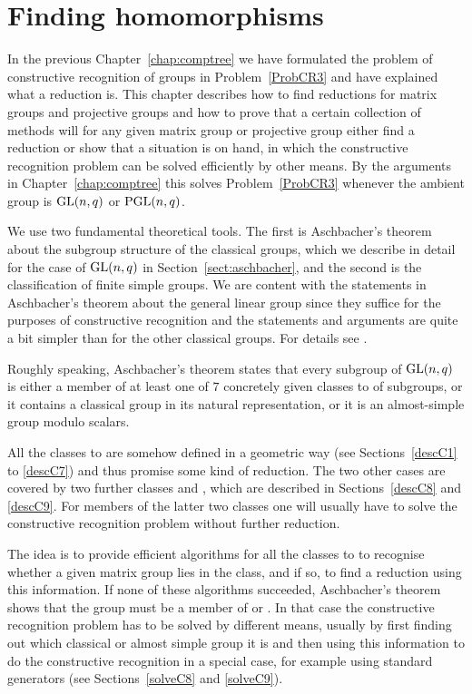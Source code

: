 
\chapter{Finding homomorphisms}
\label{chap:findhom}

In the previous Chapter~\ref{chap:comptree} we have formulated the problem
of constructive recognition of groups in Problem~\ref{ProbCR3} and have
explained what a reduction is. This chapter describes how to find
reductions for matrix groups and projective groups and how to prove
that a certain collection of methods will for any given
matrix group or projective group either find a reduction
or show that a situation is on hand, in which the constructive 
recognition problem can be solved efficiently by other means. By the 
arguments in Chapter~\ref{chap:comptree} this solves
Problem~\ref{ProbCR3} whenever the ambient group is $\GL(n,q)$ or
$\PGL(n,q)$.

We use two fundamental theoretical tools. The first is Aschbacher's theorem
about the subgroup structure of the classical groups, which we describe
in detail for the case of $\GL(n,q)$ in Section~\ref{sect:aschbacher},
and the second is the classification of finite simple groups. We are
content with the statements in Aschbacher's theorem about the general
linear group since they suffice for the purposes of constructive
recognition and the statements and arguments are quite a bit simpler
than for the other classical groups. For details see \cite{aschbacher}.

Roughly speaking, Aschbacher's theorem states that every subgroup of $\GL(n,q)$
is either a member of at least one of $7$ concretely given classes 
 to  of 
subgroups, or it contains a classical group in its natural representation, 
or it is an almost-simple group modulo scalars.

All the classes  to  are somehow defined in a geometric way (see
Sections~\ref{descC1} to \ref{descC7}) and thus promise some kind of
reduction. The two other cases are covered by two further classes 
and , which are described in Sections~\ref{descC8} and \ref{descC9}.
For members of the latter two classes one will usually have to solve the
constructive recognition problem without further reduction.

The idea is to provide efficient algorithms for all the classes  to
 to recognise whether a given matrix group lies in the class, and if
so, to find a reduction using this information. If none of these algorithms
succeeded, Aschbacher's theorem shows that the group must be a member of
 or . In that case the constructive recognition problem has to be
solved by different means, usually by first finding out which classical
or almost simple group it is and then using this information to do the
constructive recognition in a special case, for example using standard
generators (see Sections~\ref{solveC8} and \ref{solveC9}).

